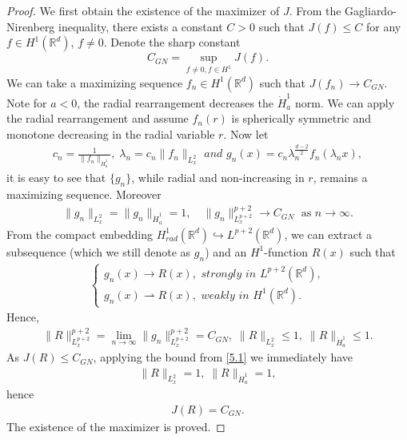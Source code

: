 \documentclass[12pt]{amsart}
\newcommand{\R}{\mathbb R}
\newcommand{\dha}{\dot H^1_a}
\begin{document}
\begin{proof}
We first obtain the existence of the maximizer of $J$. From the Gagliardo-Nirenberg inequality, there exists a constant $C>0$ such that $J(f)\le C$ for any $f\in H^1(\R^d)$, $f\neq 0$. Denote the sharp constant
$$
C_{GN}=\sup_{f\neq 0, f\in H^1} J(f).
$$
We can take a maximizing sequence $f_n\in H^1(\R^d)$ such that $J(f_n)\to C_{GN}$. Note for $a<0$, 
the radial rearrangement decreases the $\dha$ norm. We can apply the radial rearrangement and assume $f_n(r)$ is spherically symmetric and monotone decreasing in the radial variable $r$. Now let 
\begin{align*}
c_n=\frac 1{\|f_n\|_{\dha}}, \; \lambda_n=c_n \|f_n\|_{L_x^2}  \textit{ and } g_n(x)=c_n\lambda_n^{\frac {d-2}2}f_n(\lambda_n x),
\end{align*}
it is easy to see that $\{g_n\}$, while radial and non-increasing in $r$, remains a maximizing sequence. Moreover 
\begin{align*}
\|g_n\|_{L_x^2}=\|g_n\|_{\dha}=1, \quad \|g_n\|_{L_x^{p+2}}^{p+2} \to C_{GN} \; \text{ as } n \to \infty. 
\end{align*}
From the compact embedding $H_{rad}^1(\R^d)\hookrightarrow L^{p+2}(\R^d)$, we can extract a subsequence (which we still denote as $g_n$) and an $H^1$-function $R(x)$ such that 
\begin{align}\label{5}
\begin{cases}
g_n(x)\to R(x), \textit{ strongly in } L^{p+2}(\R^d),\\
g_n(x) \rightharpoonup R(x), \textit{ weakly in } H^1(\R^d). 
\end{cases}
\end{align}
Hence, 
\begin{align}\label{5.1}
\|R\|_{L_x^{p+2}}^{p+2}= \lim_{n\to \infty} \|g_n\|_{L_x^{p+2}}^{p+2}=C_{GN}, \; \|R\|_{L_x^2}\le 1,\; \|R\|_{\dha}\le 1. 
\end{align}
As $J(R)\le C_{GN}$, applying the bound from \eqref{5.1} we immediately have
\begin{align}\label{6}
 \|R\|_{L_x^2}= 1,\; \|R\|_{\dha}= 1,  
 \end{align}
 hence 
 \begin{align}
 J(R)=C_{GN}. 
 \end{align}
 The existence of the maximizer is proved. 
 

\end{proof}
\end{document}
